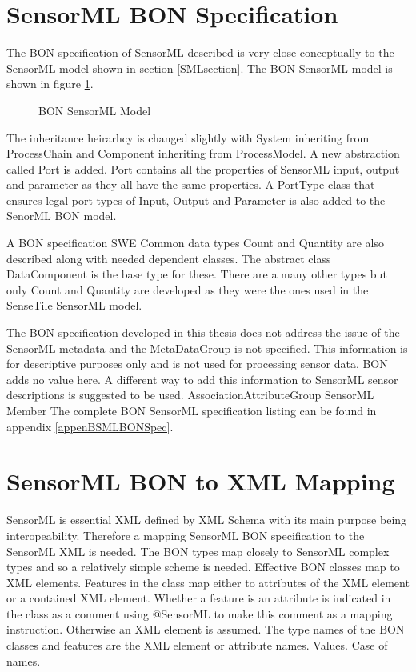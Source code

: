 \documentclass[]{final_report}
\begin{document}
\section{SensorML BON Specification}
The BON specification of SensorML described is very close conceptually to the SensorML model shown in section \ref{SMLsection}.  The BON SensorML model is shown in figure \ref{fig:bonSensoMLModel}. 
\begin{figure}[h]
\centering
{}
\caption{BON SensorML Model}\label{fig:bonSensoMLModel}
\end{figure}
The inheritance heirarhcy is changed slightly with System inheriting from ProcessChain and Component inheriting from ProcessModel. A new abstraction called Port is added. Port contains all the properties of SensorML input, output and parameter as they all have the same properties. A PortType class that ensures legal port types of Input, Output and Parameter is also added to the SenorML BON model.

A BON specification SWE Common data types Count and Quantity are also described along with needed dependent classes. The abstract class DataComponent is the base type for these. There are a many other types but only Count and Quantity are developed as they were the ones used in the SenseTile SensorML model.

The BON specification developed in this thesis does not address the issue of the SensorML metadata and the MetaDataGroup is not specified. This information is for descriptive purposes only and is not used for processing sensor data. BON adds no value here. A different way to add this information to SensorML sensor descriptions is suggested to be used.
AssociationAttributeGroup
SensorML
Member
The complete BON SensorML specification listing can be found in appendix \ref{appenBSMLBONSpec}.

\section{SensorML BON to XML Mapping}
SensorML is essential XML defined by XML Schema with its main purpose being interopeability. Therefore a mapping SensorML BON specification to the SensorML XML is needed. The BON types map closely to SensorML complex types and so a relatively simple scheme is needed.
Effective BON classes map to XML elements. Features in the class map either to attributes of the XML element or a contained XML element. Whether a feature is an attribute is indicated in the class as a comment using @SensorML to make this comment as a mapping instruction. Otherwise an XML element is assumed. The type names of the BON classes and features are the XML element or attribute names. Values. Case of names.
\end{document}
